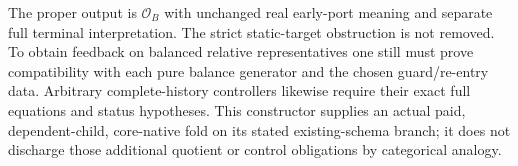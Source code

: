 \documentclass[11pt]{article}
\begin{document}
The proper output is $\mathcal O_B$ with unchanged real early-port meaning and separate full terminal interpretation. The strict static-target obstruction is not removed. To obtain feedback on balanced relative representatives one still must prove compatibility with each pure balance generator and the chosen guard/re-entry data. Arbitrary complete-history controllers likewise require their exact full equations and status hypotheses. This constructor supplies an actual paid, dependent-child, core-native fold on its stated existing-schema branch; it does not discharge those additional quotient or control obligations by categorical analogy.
\end{document}
